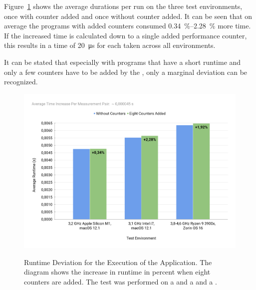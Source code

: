 Figure~\ref{fig:e:forloop_environments} shows the average durations per run on the three test environments, once with counter added and once without counter added. It can be seen that on average the programs with added counters consumed \SI{0.34}{\percent}--\SI{2.28}{\percent} more time. If the increased time is calculated down to a single added performance counter, this results in a time of \SI{20}{\micro\second} for each \MEASUREVALUE taken across all environments. 

It can be stated that especially with programs that have a short runtime and only a few counters have to be added by the \TOOL, only a marginal deviation can be recognized. 

\begin{figure}[t]
  \centering
  \caption[Runtime Deviation for the \VARYINGLOOP Application.]{Runtime Deviation for the Execution of the \VARYINGLOOP Application. The diagram shows the increase in runtime in percent when eight counters are added. The test was performed on a \IMAC and a \MACBOOK and a \AMD.} 
  \includegraphics[width=1\textwidth]{graphics/e_forloop_environments.png}
  \label{fig:e:forloop_environments}
\end{figure}

